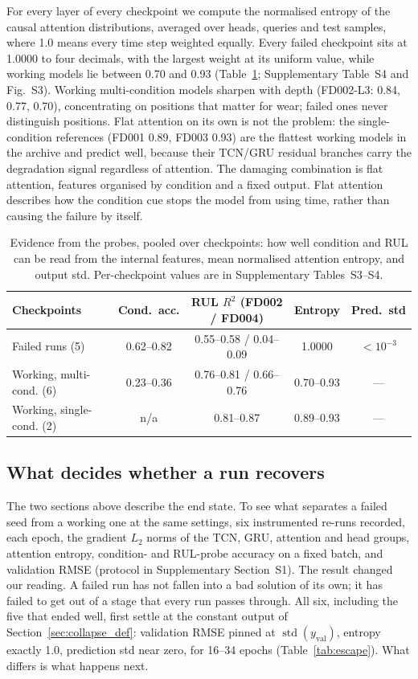 For every layer of every checkpoint we compute the normalised entropy of the
causal attention distributions, averaged over heads, queries and test
samples, where 1.0 means every time step weighted equally. Every failed
checkpoint sits at 1.0000 to four decimals, with the largest weight at its
uniform value, while working models lie between 0.70 and 0.93
(Table~\ref{tab:mechanism}; Supplementary Table~S4 and Fig.~S3). Working
multi-condition models sharpen with depth (FD002-L3: 0.84, 0.77, 0.70),
concentrating on positions that matter for wear; failed ones never
distinguish positions. Flat attention on its own is not the problem: the
single-condition references (FD001 0.89, FD003 0.93) are the flattest
working models in the archive and predict well, because their TCN/GRU
residual branches carry the degradation signal regardless of attention. The
damaging combination is flat attention, features organised by condition and
a fixed output. Flat attention describes how the condition cue stops the
model from using time, rather than causing the failure by itself.

\begin{table}[t]
\centering\footnotesize
\caption{Evidence from the probes, pooled over checkpoints: how well condition
and RUL can be read from the internal features, mean normalised attention
entropy, and output std. Per-checkpoint values are in Supplementary
Tables~S3--S4.}
\label{tab:mechanism}
\begin{tabularx}{\linewidth}{Xcccc}
\toprule
Checkpoints & Cond.\ acc. & RUL $R^2$ (FD002 / FD004) & Entropy & Pred.\ std \\
\midrule
Failed runs (5) & 0.62--0.82 & 0.55--0.58 / 0.04--0.09 & 1.0000 & $<10^{-3}$ \\
Working, multi-cond. (6) & 0.23--0.36 & 0.76--0.81 / 0.66--0.76 & 0.70--0.93 & --- \\
Working, single-cond. (2) & n/a & 0.81--0.87 & 0.89--0.93 & --- \\
\bottomrule
\end{tabularx}
\end{table}

\subsection{What decides whether a run recovers}
\label{sec:dynamics}

The two sections above describe the end state. To see what separates a failed
seed from a working one at the same settings, six instrumented re-runs
recorded, each epoch, the gradient $L_2$ norms of the TCN, GRU, attention and
head groups, attention entropy, condition- and RUL-probe accuracy on a fixed
batch, and validation RMSE (protocol in Supplementary Section~S1). The
result changed our reading. A failed run has not fallen into a bad solution
of its own; it has failed to get out of a stage that every run passes
through. All six, including the five that ended well, first settle at the
constant output of Section~\ref{sec:collapse_def}: validation RMSE pinned at
$\operatorname{std}(y_{\mathrm{val}})$, entropy exactly 1.0, prediction std
near zero, for 16--34 epochs (Table~\ref{tab:escape}). What differs is what
happens next.

